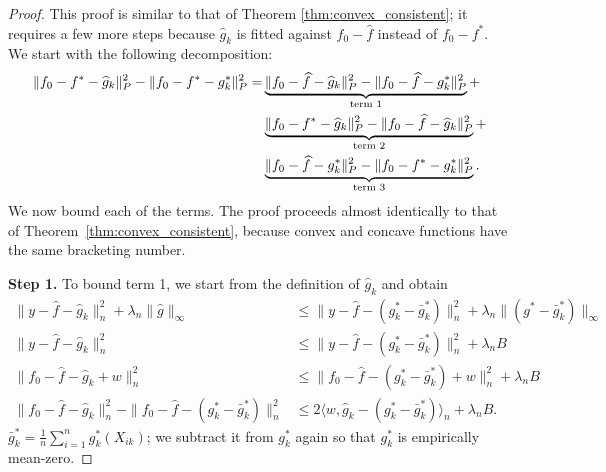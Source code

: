 \begin{proof}
This proof is similar to that of Theorem \ref{thm:convex_consistent}; it requires a few more steps because $\hat{g}_k$ is fitted against $f_0 - \hat{f}$ instead of $f_0 - f^*$. We start with the following decomposition:
\begin{align}
\| f_0 - f^* - \widehat{g}_k \|_P^2 - \| f_0 - f^* - g^*_k \|_P^2 = & \underbrace{\| f_0 - \widehat{f} - \widehat{g}_k \|_P^2 - \| f_0 - \widehat{f} - g^*_k  \|_P^2}_{\textrm{term 1}} + \nonumber \\
   & \underbrace{\| f_0 - f^* - \widehat{g}_k \|_P^2 - \| f_0 - \widehat{f} - \widehat{g}_k \|_P^2}_{\textrm{term 2}} + \nonumber \\
   & \underbrace{\| f_0 - \widehat{f} - g^*_k \|_P^2 - \| f_0 - f^* - g^*_k \|_P^2}_{\textrm{term 3}}  \label{eqn:concave_init_decomposition}.
\end{align}
We now bound each of the terms. The proof proceeds almost identically to that of Theorem~\ref{thm:convex_consistent}, because convex and concave functions have the same bracketing number.

\textbf{Step 1.} To bound term 1, we start from the definition of
$\hat{g}_k$ and obtain
\begin{align*}
\| y - \hat{f} - \hat{g}_k \|_n^2 + \lambda_n \| \hat{g} \|_\infty &\leq
   \| y - \hat{f} - (g^*_k - \bar{g}^*_k) \|_n^2 + \lambda_n \| (g^*-\bar{g}^*_k) \|_\infty \\
\| y - \hat{f} - \hat{g}_k \|_n^2 &\leq \| y - \hat{f} - (g^*_k-\bar{g}^*_k) \|_n^2 + \lambda_n B \\[10pt]
\| f_0 - \hat{f} - \hat{g}_k + w\|_n^2 & \leq \| f_0 - \hat{f} - (g^*_k-\bar{g}^*_k) + w \|_n^2 
   +\lambda_n B \\
\| f_0 - \hat{f} - \hat{g}_k \|_n^2 - \|f_0 -\hat{f} - (g^*_k-\bar{g}^*_k) \|_n^2 &\leq
   2 \langle w, \hat{g}_k - (g^*_k-\bar{g}^*_k) \rangle_n + \lambda_n B.
\end{align*}
$\bar{g}^*_k = \frac{1}{n} \sum_{i=1}^n g^*_k(X_{ik})$; we subtract it from $g^*_k$ again so that $g^*_k$ is empirically mean-zero. 


\end{proof}

